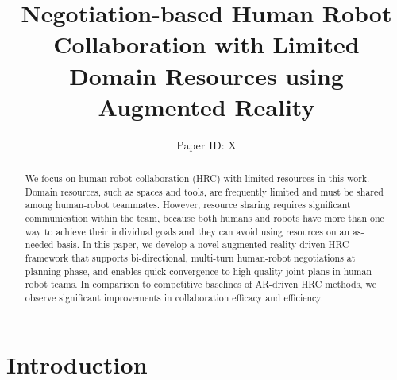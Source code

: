 \documentclass{article}
\title{Negotiation-based Human Robot Collaboration with Limited Domain Resources using Augmented Reality}
\author{Paper ID: X}
\begin{document}
\maketitle

\begin{abstract}
We focus on human-robot collaboration (HRC) with limited resources in this work. 
Domain resources, such as spaces and tools, are frequently limited and must be shared among human-robot teammates. 
However, resource sharing requires significant communication within the team, because both humans and robots have more than one way to achieve their individual goals and they can avoid using resources on an as-needed basis. 
In this paper, we develop a novel augmented reality-driven HRC framework that supports bi-directional, multi-turn human-robot negotiations at planning phase, and enables quick convergence to high-quality joint plans in human-robot teams. 
In comparison to competitive baselines of AR-driven HRC methods, we observe significant improvements in collaboration efficacy and efficiency. 
\end{abstract}




\section{Introduction}
\label{sec:intro}
\end{document}

